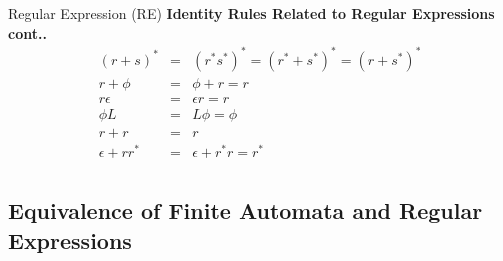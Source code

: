 \documentclass{beamer}
\begin{document}
\begin{frame}{Regular Expression (RE)}
	\small
	\textbf{Identity Rules Related to Regular Expressions cont..}
	\begin{eqnarray*}
		(r + s)^* &=& (r^*s^*)^* = (r^* + s^*)^* =(r+s^*)^*\\
		r + \phi &=& \phi + r = r \\
		r \epsilon &=& \epsilon r = r\\
		\phi L &=& L \phi = \phi\\
		r + r &=& r\\
		\epsilon + rr^* &=& \epsilon + r^*r = r^*
\\
	\end{eqnarray*}
\end{frame}
\subsection{Equivalence of Finite Automata and Regular Expressions}
\end{document}
